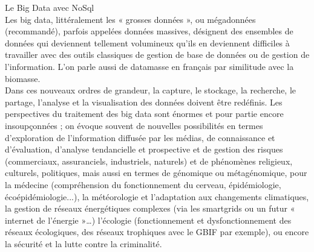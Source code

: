  Le Big Data avec NoSql\\
Les big data, littéralement les « grosses données », ou mégadonnées (recommandé), parfois appelées données massives, désignent des ensembles de données qui deviennent tellement volumineux qu'ils en deviennent difficiles à travailler avec des outils classiques de gestion de base de données ou de gestion de l'information. L'on parle aussi de datamasse en français par similitude avec la biomasse. \\
Dans ces nouveaux ordres de grandeur, la capture, le stockage, la recherche, le partage, l'analyse et la visualisation des données doivent être redéfinis. Les perspectives du traitement des big data sont énormes et pour partie encore insoupçonnées ; on évoque souvent de nouvelles possibilités en termes d'exploration de l'information diffusée par les médias, de connaissance et d'évaluation, d'analyse tendancielle et prospective et de gestion des risques (commerciaux, assuranciels, industriels, naturels) et de phénomènes religieux, culturels, politiques, mais aussi en termes de génomique ou métagénomique, pour la médecine (compréhension du fonctionnement du cerveau, épidémiologie, écoépidémiologie...), la météorologie et l'adaptation aux changements climatiques, la gestion de réseaux énergétiques complexes (via les smartgrids ou un futur « internet de l'énergie »…) l'écologie (fonctionnement et dysfonctionnement des réseaux écologiques, des réseaux trophiques avec le GBIF par exemple), ou encore la sécurité et la lutte contre la criminalité. \\

